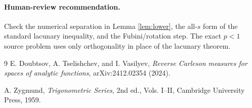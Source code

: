 \documentclass[11pt]{article}
\begin{document}
\paragraph{Human-review recommendation.}
Check the numerical separation in Lemma \ref{lem:lower}, the all-$s$ form of
the standard lacunary inequality, and the Fubini/rotation step.  The exact
$p<1$ source problem uses only orthogonality in place of the lacunary theorem.

\begin{thebibliography}{9}
E. Doubtsov, A. Tselishchev, and I. Vasilyev,
\emph{Reverse Carleson measures for spaces of analytic functions},
arXiv:2412.02354 (2024).

A. Zygmund,
\emph{Trigonometric Series}, 2nd ed., Vols. I--II,
Cambridge University Press, 1959.
\end{thebibliography}
\end{document}
